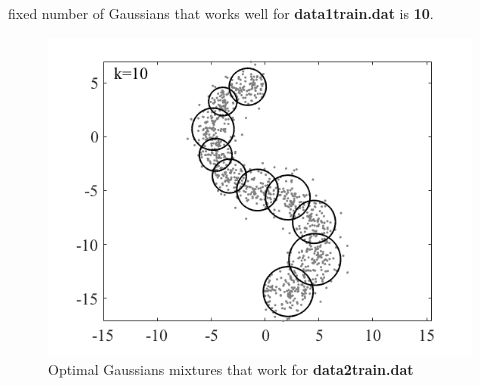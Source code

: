 \documentclass{article}
\begin{document}
fixed number of Gaussians that works well for \textbf{data1train.dat} is \textbf{10}.
\begin{figure}[h!]
\centering
\includegraphics[scale=0.6]{fig/HW6P1_22.png}
\caption{Optimal Gaussians mixtures that work for \textbf{data2train.dat}}
\end{figure}
\end{document}
